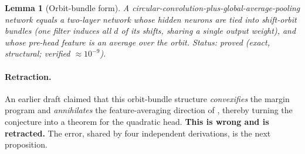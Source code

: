 \documentclass[11pt]{article}
\theoremstyle{plain}
\newtheorem{lemma}{Lemma}
\theoremstyle{definition}
\theoremstyle{remark}
\begin{document}
\begin{lemma}[Orbit-bundle form]\label{lem:bundle}
A circular-convolution-plus-global-average-pooling network equals a two-layer network whose hidden neurons are tied into shift-orbit bundles (one filter induces all $d$ of its shifts, sharing a single output weight), and whose pre-head feature is an average over the orbit. \emph{Status: proved (exact, structural; verified $\approx10^{-9}$).}
\end{lemma}

\paragraph{Retraction.} An earlier draft claimed that this orbit-bundle structure \emph{convexifies} the margin program and \emph{annihilates} the feature-averaging direction of \citet{frei2023double,li2025feature}, thereby turning the \citet{min2024can} conjecture into a theorem for the quadratic head. \textbf{This is wrong and is retracted.} The error, shared by four independent derivations, is the next proposition.
\end{document}
